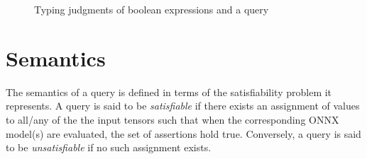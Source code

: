 \begin{figure}
    \begin{minipage}[t]{1\textwidth}
    \caption{Typing judgments of boolean expressions and a \vnnlib{} query}
    \label{fig:typing-boolExpr-query}
    \end{minipage}
\end{figure}

\section{Semantics}
\label{sec:semantics}

The semantics of a \vnnlib{} query is defined in terms of the satisfiability problem it represents. A query is said to be \textit{satisfiable} if there exists an assignment of values to all/any of the the input tensors such that when the corresponding ONNX model(s) are evaluated, the set of assertions hold true. Conversely, a query is said to be \textit{unsatisfiable} if no such assignment exists.

